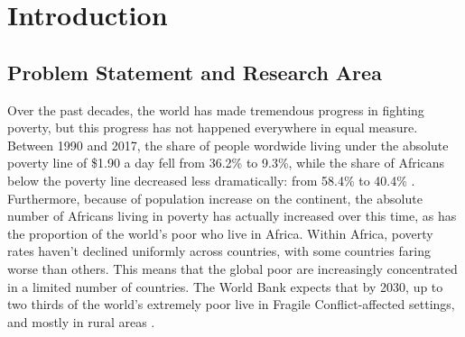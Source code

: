\chapter{Introduction}



\section{Problem Statement and Research Area}




Over the past decades, the world has made tremendous progress in fighting poverty, but this progress has not happened everywhere in equal measure. Between 1990 and 2017, the share of people wordwide living under the absolute poverty line of \$1.90 a day fell from 36.2\% to 9.3\%, while the share of Africans below the poverty line decreased less dramatically: from 58.4\% to 40.4\% \citep{WorldBank2021}. Furthermore, because of population increase on the continent, the absolute number of Africans living in poverty has actually increased over this time, as has the proportion of the world's poor who live in Africa. Within Africa, poverty rates haven't declined uniformly across countries, with some countries faring worse than others. This means that the global poor are increasingly concentrated in a limited number of countries. The World Bank expects that by 2030, up to two thirds of the world's extremely poor live in Fragile Conflict-affected settings, and mostly in rural areas \citep{WorldBank2019}. %

